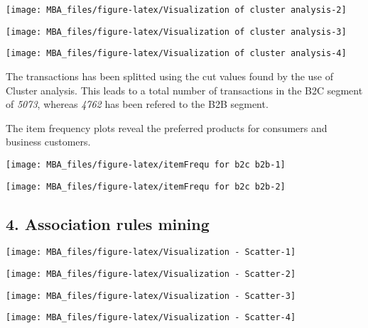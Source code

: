 \documentclass[]{article}
\begin{document}
\begin{center}\texttt{[image: MBA\_files/figure-latex/Visualization of cluster analysis-2]} \end{center}

\begin{center}\texttt{[image: MBA\_files/figure-latex/Visualization of cluster analysis-3]} \end{center}

\begin{center}\texttt{[image: MBA\_files/figure-latex/Visualization of cluster analysis-4]} \end{center}

The transactions has been splitted using the cut values found by the use
of Cluster analysis. This leads to a total number of transactions in the
B2C segment of \emph{5073}, whereas \emph{4762} has been refered to the
B2B segment.

The item frequency plots reveal the preferred products for consumers and
business customers.

\begin{center}\texttt{[image: MBA\_files/figure-latex/itemFrequ for b2c b2b-1]} \end{center}

\begin{center}\texttt{[image: MBA\_files/figure-latex/itemFrequ for b2c b2b-2]} \end{center}

\hypertarget{association-rules-mining}{%
\subsection{4. Association rules
mining}\label{association-rules-mining}}

\begin{center}\texttt{[image: MBA\_files/figure-latex/Visualization - Scatter-1]} \end{center}

\begin{center}\texttt{[image: MBA\_files/figure-latex/Visualization - Scatter-2]} \end{center}

\begin{center}\texttt{[image: MBA\_files/figure-latex/Visualization - Scatter-3]} \end{center}

\begin{center}\texttt{[image: MBA\_files/figure-latex/Visualization - Scatter-4]} \end{center}
\end{document}
